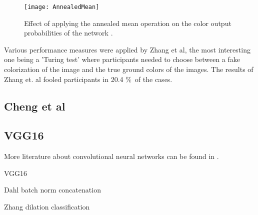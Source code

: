\begin{figure}[h]
\centering
	\texttt{[image: AnnealedMean]}
\centering
\caption{Effect of applying the annealed mean operation on the  color output probabilities of the network \cite{yu2015multi}.}
\label{fig:anmean}
\end{figure}

Various performance measures were applied by Zhang et al, the most interesting one being a 'Turing test' where participants needed to choose between a fake colorization of the image and the true ground colors of the images. The results of Zhang et. al fooled participants in 20.4 \%\ of the cases. 



\subsection{Cheng et al}

\subsection{VGG16}




More literature about convolutional neural networks can be found in \cite{GoodfellowBOOK}. 


%

VGG16




Dahl
batch norm
concatenation




Zhang
dilation
classification








